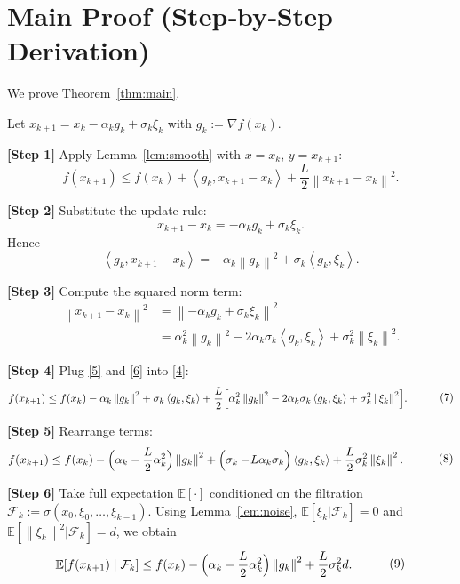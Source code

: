 \documentclass{article}
\newcommand{\E}{\mathbb{E}}
\newcommand{\norm}[1]{\left\|#1\right\|}
\newcommand{\ip}[2]{\left\langle #1,#2\right\rangle}
\begin{document}
\section*{Main Proof (Step‑by‑Step Derivation)}
We prove Theorem~\ref{thm:main}.  

Let $x_{k+1}=x_k-\alpha_k g_k+\sigma_k\xi_k$ with $g_k:=\nabla f(x_k)$.  

\noindent\textbf{[Step 1]} Apply Lemma~\ref{lem:smooth} with $x=x_k$, $y=x_{k+1}$:
\[
f(x_{k+1})\le f(x_k)+\ip{g_k}{x_{k+1}-x_k}+\frac{L}{2}\norm{x_{k+1}-x_k}^{2}.
\tag{4}
\]

\noindent\textbf{[Step 2]} Substitute the update rule:
\[
x_{k+1}-x_k = -\alpha_k g_k+\sigma_k\xi_k.
\]
Hence
\[
\ip{g_k}{x_{k+1}-x_k}= -\alpha_k\norm{g_k}^{2}+\sigma_k\ip{g_k}{\xi_k}. \tag{5}
\]

\noindent\textbf{[Step 3]} Compute the squared norm term:
\[
\begin{aligned}
\norm{x_{k+1}-x_k}^{2}
&= \norm{-\alpha_k g_k+\sigma_k\xi_k}^{2}\\
&= \alpha_k^{2}\norm{g_k}^{2}
   -2\alpha_k\sigma_k\ip{g_k}{\xi_k}
   +\sigma_k^{2}\norm{\xi_k}^{2}. \tag{6}
\end{aligned}
\]

\noindent\textbf{[Step 4]} Plug \eqref{5} and \eqref{6} into \eqref{4}:
\[
\begin{aligned}
f(x_{k+1}) &\le f(x_k)
-\alpha_k\norm{g_k}^{2}
+\sigma_k\ip{g_k}{\xi_k}
+\frac{L}{2}\Bigl[
\alpha_k^{2}\norm{g_k}^{2}
-2\alpha_k\sigma_k\ip{g_k}{\xi_k}
+\sigma_k^{2}\norm{\xi_k}^{2}
\Bigr] .
\end{aligned}
\tag{7}
\]

\noindent\textbf{[Step 5]} Rearrange terms:
\[
\begin{aligned}
f(x_{k+1}) &\le f(x_k)
-\Bigl(\alpha_k-\frac{L}{2}\alpha_k^{2}\Bigr)\norm{g_k}^{2}
+\Bigl(\sigma_k-\!L\alpha_k\sigma_k\Bigr)\ip{g_k}{\xi_k}
+\frac{L}{2}\sigma_k^{2}\norm{\xi_k}^{2}.
\end{aligned}
\tag{8}
\]

\noindent\textbf{[Step 6]} Take full expectation $\E[\cdot]$ conditioned on the filtration $\mathcal F_k:=\sigma(x_0,\xi_0,\dots,\xi_{k-1})$.  
Using Lemma~\ref{lem:noise}, $\E[\xi_k|\mathcal F_k]=0$ and $\E[\norm{\xi_k}^{2}|\mathcal F_k]=d$, we obtain
\[
\begin{aligned}
\E\!\left[f(x_{k+1})\mid\mathcal F_k\right]
&\le f(x_k)
-\Bigl(\alpha_k-\frac{L}{2}\alpha_k^{2}\Bigr)\norm{g_k}^{2}
+\frac{L}{2}\sigma_k^{2}d .
\end{aligned}
\tag{9}
\]
\end{document}
